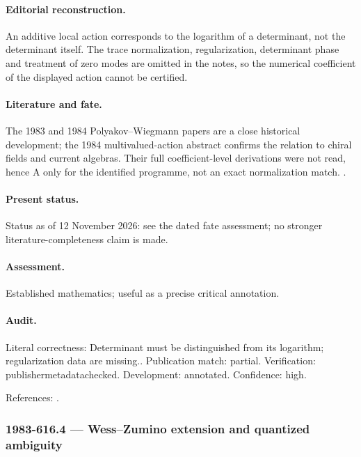 \paragraph{Editorial reconstruction.} An additive local action corresponds to the logarithm of a determinant, not the determinant itself. The trace normalization, regularization, determinant phase and treatment of zero modes are omitted in the notes, so the numerical coefficient of the displayed action cannot be certified.

\paragraph{Literature and fate.} The 1983 and 1984 Polyakov--Wiegmann papers are a close historical development; the 1984 multivalued-action abstract confirms the relation to chiral fields and current algebras. Their full coefficient-level derivations were not read, hence A only for the identified programme, not an exact normalization match. \citep{polyakovwiegmann1983goldstone,polyakovwiegmann1984multivalued}.

\paragraph{Present status.} Status as of 12 November 2026: see the dated fate assessment; no stronger literature-completeness claim is made.

\paragraph{Assessment.} Established mathematics; useful as a precise critical annotation.

\paragraph{Audit.} Literal correctness: Determinant must be distinguished from its logarithm; regularization data are missing.. Publication match: partial. Verification: publishermetadatachecked. Development: annotated. Confidence: high.

\noindent References: \citep{polyakovwiegmann1983goldstone,polyakovwiegmann1984multivalued}.\par

\subsubsection{1983-616.4 --- Wess--Zumino extension and quantized ambiguity}

